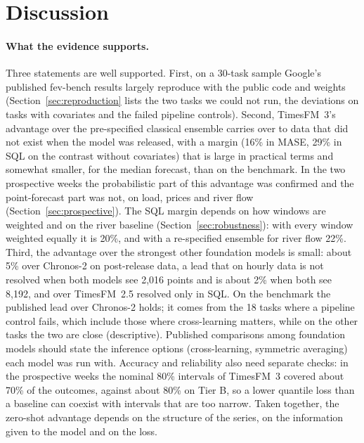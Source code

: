 \section{Discussion}
\label{sec:discussion}

\paragraph{What the evidence supports.} Three statements are well supported. First, on a 30-task sample Google's published fev-bench results
largely reproduce with the public code and weights (Section~\ref{sec:reproduction} lists the two tasks we could not run, the
deviations on tasks with covariates and the failed pipeline controls). Second, TimesFM~3's advantage over the pre-specified classical ensemble carries over to
data that did not exist when the model was released, with a margin (16\% in MASE, 29\% in SQL on the contrast without covariates)
that is large in practical terms and somewhat smaller, for the median forecast, than on the benchmark. In the two prospective
weeks the probabilistic part of this advantage was confirmed and the point-forecast part was not, on load, prices and river flow
(Section~\ref{sec:prospective}). The SQL margin depends on how windows
are weighted and on the river baseline (Section~\ref{sec:robustness}): with every window weighted equally it is 20\%, and with a
re-specified ensemble for river flow 22\%. Third, the advantage over the strongest other
foundation models is small: about 5\% over Chronos-2 on post-release data, a lead that on hourly data is not resolved when both models see
2{,}016 points and is about 2\% when both see 8{,}192, and over TimesFM~2.5 resolved only in SQL. On the
benchmark the published lead over Chronos-2 holds; it comes from the 18 tasks where a pipeline control fails, which include those where cross-learning matters, while on the
other tasks the two are close (descriptive). Published comparisons among foundation models should state the inference options (cross-learning, symmetric
averaging) each model was run with. Accuracy and reliability also need separate checks: in the prospective weeks the nominal
80\% intervals of TimesFM~3 covered about 70\% of the outcomes, against about 80\% on Tier B, so a lower quantile loss than a
baseline can coexist with intervals that are too narrow. Taken together, the zero-shot advantage depends on the structure of the
series, on the information given to the model and on the loss.

